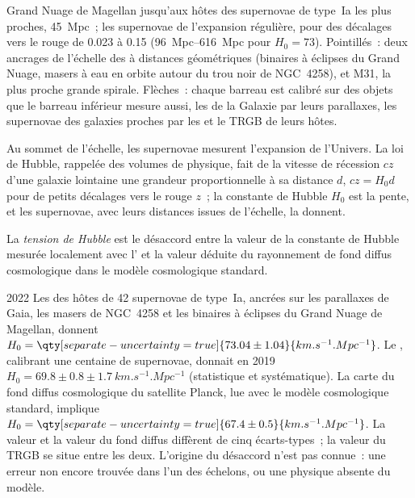 \begin{omfigure}
{Grand Nuage de Magellan jusqu'aux hôtes des supernovae de type~Ia les plus proches,
\qty{45}{Mpc}~; les supernovae de l'expansion régulière, pour des décalages vers
le rouge de 0.023 à 0.15 (\qtyrange{96}{616}{Mpc} pour $H_0 = 73$). Pointillés~:
deux ancrages de l'échelle des  à distances géométriques (binaires à
éclipses du Grand Nuage, masers à eau en orbite autour du trou noir de NGC~4258), et M31, la
plus proche grande spirale. Flèches~: chaque barreau est calibré sur des objets que le
barreau inférieur mesure aussi, les  de la Galaxie par leurs parallaxes,
les supernovae des galaxies proches par les  et le TRGB de leurs
hôtes.}\label{fig:b3:milky-way-galaxies:ladder-rungs}
\end{omfigure}

Au sommet de l'échelle, les supernovae mesurent l'expansion de
l'Univers. La loi de Hubble, rappelée des volumes de physique, fait de la
vitesse de récession $cz$ d'une galaxie lointaine une grandeur proportionnelle à sa distance $d$,
$cz = H_0 d$ pour de petits décalages vers le rouge $z$~; la constante de Hubble $H_0$ est la
pente, et les supernovae, avec leurs distances issues de l'échelle, la donnent.

\begin{definition}\label{def:b3:milky-way-galaxies:tension}
La \emph{tension de Hubble} est le désaccord entre la
valeur de la constante de Hubble mesurée localement avec l'
et la valeur déduite du rayonnement de fond diffus cosmologique
dans le modèle cosmologique standard.
\end{definition}

\begin{dated}{2022}
Les  des hôtes de 42 supernovae de type~Ia, ancrées sur les
parallaxes de Gaia, les masers de NGC~4258 et les binaires à éclipses du
Grand Nuage de Magellan, donnent
$H_0 = \qty[separate-uncertainty=true]{73.04 \pm 1.04}{km.s^{-1}.Mpc^{-1}}$.
Le , calibrant une centaine de
supernovae, donnait en 2019 $H_0 = 69.8 \pm 0.8 \pm \qty{1.7}{km.s^{-1}.Mpc^{-1}}$
(statistique et systématique). La carte du fond diffus cosmologique du satellite
Planck, lue avec le modèle cosmologique standard, implique
$H_0 = \qty[separate-uncertainty=true]{67.4 \pm 0.5}{km.s^{-1}.Mpc^{-1}}$.
La valeur  et la valeur du fond diffus diffèrent de cinq écarts-types~;
la valeur du TRGB se situe entre les deux. L'origine du
désaccord n'est pas connue~: une erreur non encore trouvée dans l'un des échelons,
ou une physique absente du modèle.
\end{dated}

